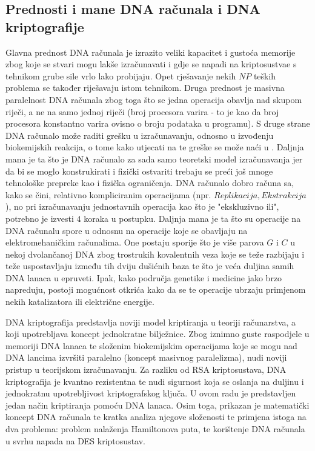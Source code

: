 \documentclass[a4paper,oneside,12pt]{memoir} %
\begin{document}
\begin{spacing}{1.5}
\section{Prednosti i mane DNA računala i DNA kriptografije}
Glavna prednost DNA računala je izrazito veliki kapacitet i gustoća memorije zbog koje se stvari mogu lakše izračunavati i gdje se napadi na kriptosustvae s tehnikom grube sile vrlo lako probijaju. Opet rješavanje nekih $NP$ teških problema se također riješavaju istom tehnikom. Druga prednost je masivna paralelnost DNA računala zbog  toga što se jedna operacija obavlja nad skupom riječi, a ne na samo jednoj riječi (broj procesora varira - to je kao da broj procesora konstantno varira ovisno o broju podataka u programu). S druge strane DNA računalo može raditi grešku u izračunavanju, odnosno u izvođenju biokemijskih reakcija, o tome kako utjecati na te greške se može naći u \cite{DNAerr}. Daljnja mana je ta što je DNA računalo za sada samo teoretski model izračunavanja jer da bi se moglo konstrukirati i fizički ostvariti trebaju se preći još mnoge tehnološke prepreke kao i fizička ograničenja. DNA računalo dobro računa sa, kako se čini, relativno kompliciranim operacijama (npr. $Replikacija, Ekstrakcija$), no pri izračunavanju jednostavnih operacija kao što je "ekskluzivno ili", potrebno je izvesti $4$ koraka u postupku. Daljnja mana je ta što su operacije na DNA računalu spore u odnosnu na operacije koje se obavljaju na elektromehaničkim računalima. One postaju sporije što je više parova $G$ i $C$ u nekoj dvolančanoj DNA zbog trostrukih kovalentnih veza koje se teže razbijaju i teže uspostavljaju između tih dviju dušićnih baza te što je veća duljina samih DNA lanaca u epruveti. Ipak, kako područja genetike i medicine jako brzo napreduju, postoji mogućnost otkrića kako da se te operacije ubrzaju primjenom nekih katalizatora ili električne energije. 

\newpage
\nocite{*}


\pagestyle{empty}
\begin{sazetak}
DNA kriptografija predstavlja noviji model kriptiranja u teoriji računarstva, a koji upotrebljava koncept jednokratne bilježnice. Zbog iznimno guste raspodjele u memoriji DNA lanaca te složenim biokemijskim operacijama koje se mogu nad DNA lancima izvršiti paralelno (koncept masivnog paralelizma), nudi noviji pristup u teorijskom izračunavanju. Za razliku od RSA kriptosustava, DNA kriptografija je kvantno rezistentna te nudi sigurnost koja se oslanja na duljinu i jednokratnu upotrebljivost kriptografskog ključa. U ovom radu je predstavljen jedan način kriptiranja pomoću DNA lanaca. Osim toga, prikazan je matematički koncept DNA računala te kratka analiza njegove složenosti te primjena istoga na dva problema: problem nalaženja Hamiltonova puta, te korištenje DNA računala u svrhu napada na DES kriptosustav.
\end{sazetak}


\end{spacing}
\end{document}
